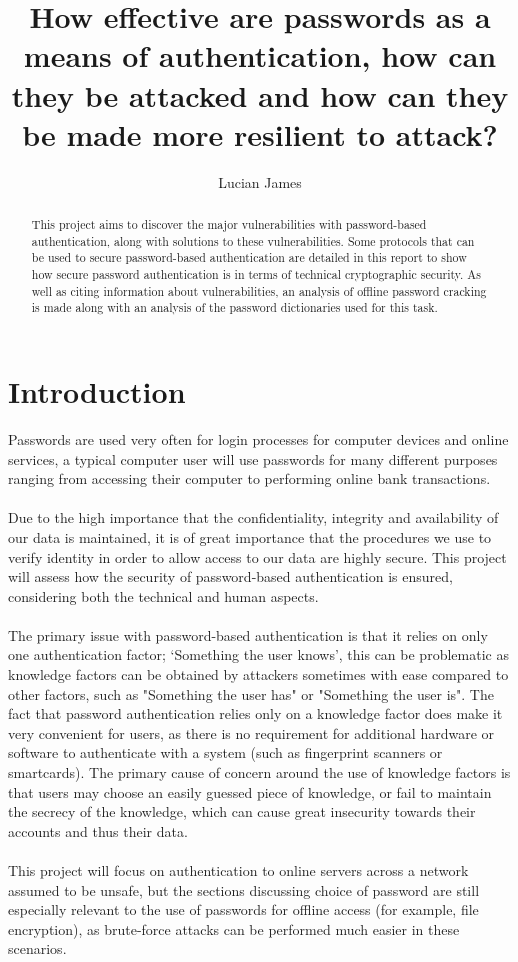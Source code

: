 \documentclass[11pt]{article}
\title{How effective are passwords as a means of authentication, how can they be attacked and how can they be made more resilient to attack?}
\author{Lucian James}
\begin{document}
\maketitle
\begin{abstract}
This project aims to discover the major vulnerabilities with password-based authentication, along with solutions to these vulnerabilities.
Some protocols that can be used to secure password-based authentication are detailed in this report to show how secure password authentication is in terms of technical cryptographic security.
As well as citing information about vulnerabilities, an analysis of offline password cracking is made along with an analysis of the password dictionaries used for this task.
\end{abstract}



\section{Introduction} \label{INTRO}
Passwords are used very often for login processes for computer devices and online services, a typical computer user will use passwords for many different purposes ranging from accessing their computer to performing online bank transactions.\\\\
Due to the high importance that the confidentiality, integrity and availability of our data is maintained, it is of great importance that the procedures we use to verify identity in order to allow access to our data are highly secure.
This project will assess how the security of password-based authentication is ensured, considering both the technical and human aspects.\\\\
The primary issue with password-based authentication is that it relies on only one authentication factor; `Something the user knows', this can be problematic as knowledge factors can be obtained by attackers sometimes with ease compared to other factors, such as "Something the user has" or "Something the user is".
The fact that password authentication relies only on a knowledge factor does make it very convenient for users, as there is no requirement for additional hardware or software to authenticate with a system (such as fingerprint scanners or smartcards).
The primary cause of concern around the use of knowledge factors is that users may choose an easily guessed piece of knowledge, or fail to maintain the secrecy of the knowledge, which can cause great insecurity towards their accounts and thus their data.\\\\
This project will focus on authentication to online servers across a network assumed to be unsafe, but the sections discussing choice of password are still especially relevant to the use of passwords for offline access (for example, file encryption), as brute-force attacks can be performed much easier in these scenarios.
\end{document}
